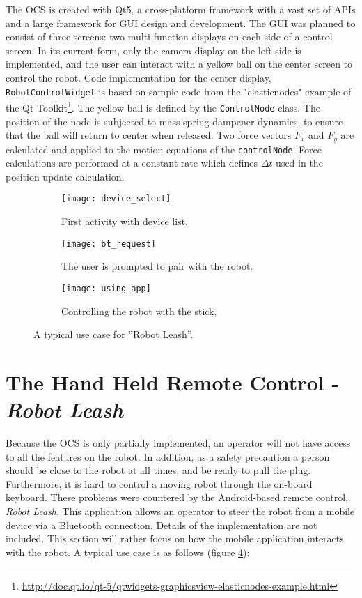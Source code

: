 The \ac{OCS} is created with Qt5, a cross-platform framework with a vast set of APIs and a large framework for \ac{GUI} design and development. The \ac{GUI} was planned to consist of three screens: two multi function displays on each side of a control screen. In its current form, only the camera display on the left side is implemented, and the user can interact with a yellow ball on the center screen to control the robot. Code implementation for the center display, \texttt{RobotControlWidget} is based on sample code from the "elasticnodes" example of the Qt Toolkit\footnote{\url{http://doc.qt.io/qt-5/qtwidgets-graphicsview-elasticnodes-example.html}}. The yellow ball is defined by the \texttt{ControlNode} class. The position of the node is subjected to mass-spring-dampener dynamics, to ensure that the ball will return to center when released. Two force vectors $F_x$ and $F_y$ are calculated and applied to the motion equations of the \texttt{controlNode}. Force calculations are performed at a constant rate which defines $\Delta t$ used in the position update calculation.  

\begin{figure}[H]
	\centering
	\begin{subfigure}[b]{0.30\textwidth}
		\texttt{[image: device\_select]}
		\caption{First activity with device list.}
		\label{fig:device_select}
	\end{subfigure}
	\begin{subfigure}[b]{0.30\textwidth}
		\texttt{[image: bt\_request]}
		\caption{The user is prompted to pair with the robot.}
		\label{fig:bt_request}
	\end{subfigure}
	\begin{subfigure}[b]{0.30\textwidth}
		\texttt{[image: using\_app]}
		\caption{Controlling the robot with the stick.}
		\label{fig:using_app}
	\end{subfigure}
	\caption{\label{fig:app_screens}A typical use case for ''Robot Leash''.}
\end{figure}

\section{The Hand Held Remote Control - \textit{Robot Leash}}

Because the \ac{OCS} is only partially implemented, an operator will not have access to all the features on the robot. In addition, as a safety precaution a person should be close to the robot at all times, and be ready to pull the plug. Furthermore, it is hard to control a moving robot through the on-board keyboard. These problems were countered by the Android-based remote control, \textit{Robot Leash}. This application allows an operator to steer the robot from a mobile device via a Bluetooth connection. Details of the implementation are not included. This section will rather focus on how the mobile application interacts with the robot. A typical use case is as follows (figure \ref{fig:app_screens}):


